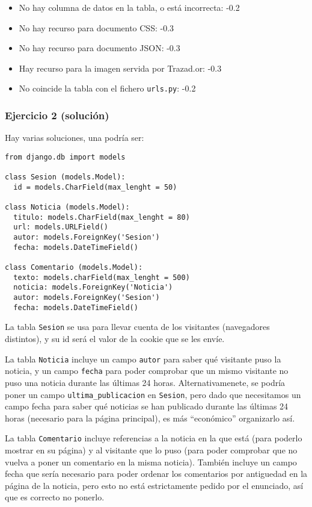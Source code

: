 \begin{itemize}
\item No hay columna de datos en la tabla, o está incorrecta: -0.2
\item No hay recurso para documento CSS: -0.3
\item No hay recurso para documento JSON: -0.3
\item Hay recurso para la imagen servida por Trazad.or: -0.3
\item No coincide la tabla con el fichero \texttt{urls.py}: -0.2
\end{itemize}

\subsubsection{Ejercicio 2 (solución)}

Hay varias soluciones, una podría ser:

\begin{verbatim}
from django.db import models

class Sesion (models.Model):
  id = models.CharField(max_lenght = 50)

class Noticia (models.Model):
  titulo: models.CharField(max_lenght = 80)
  url: models.URLField()
  autor: models.ForeignKey('Sesion')
  fecha: models.DateTimeField()

class Comentario (models.Model):
  texto: models.charField(max_lenght = 500)
  noticia: models.ForeignKey('Noticia')
  autor: models.ForeignKey('Sesion')
  fecha: models.DateTimeField()
\end{verbatim}

La tabla \texttt{Sesion} se usa para llevar cuenta de los visitantes (navegadores distintos), y su id será el valor de la cookie que se les envíe.

La tabla \texttt{Noticia} incluye un campo \texttt{autor} para saber qué visitante puso la noticia, y un campo \texttt{fecha} para poder comprobar que un mismo visitante no puso una noticia durante las últimas 24 horas. Alternativamenete, se podría poner un campo \texttt{ultima\_publicacion} en \texttt{Sesion}, pero dado que necesitamos un campo fecha para saber qué noticias se han publicado durante las últimas 24 horas (necesario para la página principal), es más ``económico'' organizarlo así.

La tabla \texttt{Comentario} incluye referencias a la noticia en la que está (para poderlo mostrar en su página) y al visitante que lo puso (para poder comprobar que no vuelva a poner un comentario en la misma noticia). También incluye un campo fecha que sería necesario para poder ordenar los comentarios por antiguedad en la página de la noticia, pero esto no está estrictamente pedido por el enunciado, así que es correcto no ponerlo.

